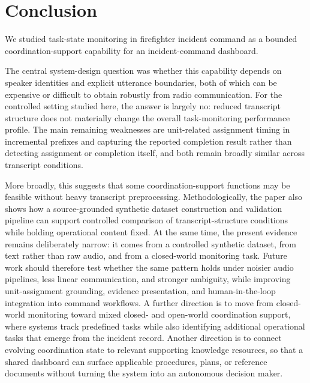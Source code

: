 \section{Conclusion}
\label{sec:conclusion}

We studied task-state monitoring in firefighter incident command as a bounded coordination-support capability for an incident-command dashboard.

The central system-design question was whether this capability depends on speaker identities and explicit utterance boundaries, both of which can be expensive or difficult to obtain robustly from radio communication. For the controlled setting studied here, the answer is largely no: reduced transcript structure does not materially change the overall task-monitoring performance profile. The main remaining weaknesses are unit-related assignment timing in incremental prefixes and capturing the reported completion result rather than detecting assignment or completion itself, and both remain broadly similar across transcript conditions.

More broadly, this suggests that some coordination-support functions may be feasible without heavy transcript preprocessing. Methodologically, the paper also shows how a source-grounded synthetic dataset construction and validation pipeline can support controlled comparison of transcript-structure conditions while holding operational content fixed. At the same time, the present evidence remains deliberately narrow: it comes from a controlled synthetic dataset, from text rather than raw audio, and from a closed-world monitoring task. Future work should therefore test whether the same pattern holds under noisier audio pipelines, less linear communication, and stronger ambiguity, while improving unit-assignment grounding, evidence presentation, and human-in-the-loop integration into command workflows. A further direction is to move from closed-world monitoring toward mixed closed- and open-world coordination support, where systems track predefined tasks while also identifying additional operational tasks that emerge from the incident record. Another direction is to connect evolving coordination state to relevant supporting knowledge resources, so that a shared dashboard can surface applicable procedures, plans, or reference documents without turning the system into an autonomous decision maker.
